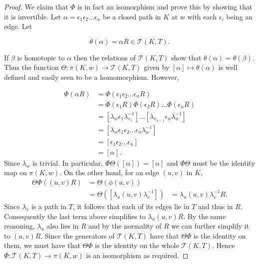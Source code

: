 \begin{proof}
We claim that $\Phi$ is in fact an isomorphism and prove this by showing that it is invertible. Let $\alpha = \epsilon_1 \epsilon_2 \dots \epsilon_n$ be a closed path in $K$ at $w$ with each $\epsilon_i$ being an edge. Let

\begin{equation*}
\theta(\alpha) = \alpha R \in \mathcal{T}(K,T).
\end{equation*}

If $\beta$ is homotopic to $\alpha$ then the relations of $\mathcal{T}(K,T)$ show that $\theta(\alpha) = \theta(\beta)$. Thus the function $\Theta:\pi(K,w) \rightarrow \mathcal{T}(K,T)$ given by $[\alpha] \mapsto \theta(\alpha)$ is well defined and easily seen to be a homomorphism. However,

\begin{align*}
  \Phi(\alpha R) &= \Phi(\epsilon_1 \epsilon_2 \dots \epsilon_n R) \\
                 &= \Phi(\epsilon_1 R) \Phi(\epsilon_2 R) \dots \Phi(\epsilon_n R) \\
                 &= [\lambda_w \epsilon_1 \lambda_{v_1}^{-1}]  \dots [\lambda_{v_{n-1}}\epsilon_n \lambda_w^{-1}] \\
                 &= [\lambda_w\epsilon_1 \epsilon_2 \dots \epsilon_n \lambda_w^{-1}] \\
                 &= [\epsilon_1 \epsilon_2 \dots \epsilon_n] \\
                 &= [\alpha].
\end{align*}
Since $\lambda_w$ is trivial. In particular, $\Phi\Theta([\alpha]) = [\alpha]$ and $\Phi\Theta$ must be the identity map on $\pi(K,w)$. On the other hand, for an edge $(u,v)$ in $K$,
\begin{align*}
  \Theta\Phi((u,v) R) &= \Theta(\phi(u,v)) \\
                      &= \Theta([\lambda_u(u,v)\lambda_v^{-1}])
                      &= \lambda_u (u,v) \lambda_v^{-1} R.
\end{align*}
Since $\lambda_v$ is a path in $T$, it follows that each of its edges lie in $T$ and thus in $R$. Consequently the last term above simplifies to $\lambda_u(u,v)R$. By the same reasoning, $\lambda_u$ also lies in $R$ and by the normality of $R$ we can further simplify it to $(u,v) R$. Since the generators of $\mathcal{T}(K,T)$ have that $\Theta\Phi$ is the identity on them, we must have that $\Theta\Phi$ is the identity on the whole $\mathcal{T}(K,T)$. Hence $\Phi: \mathcal{T}(K,T) \rightarrow \pi(K,w)$ is an isomorphism as required.
\end{proof}

